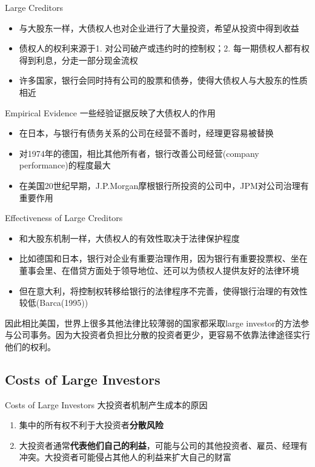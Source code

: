 %
	\begin{frame}{Large Creditors}
	\begin{itemize}
	\item 与大股东一样，大债权人也对企业进行了大量投资，希望从投资中得到收益
	\item 债权人的权利来源于1. 对公司破产或违约时的控制权；2. 每一期债权人都有权得到利息，分走一部分现金流权
	\item 许多国家，银行会同时持有公司的股票和债券，使得大债权人与大股东的性质相近
	\end{itemize}

\end{frame}

	\begin{frame}{Empirical Evidence}
	一些经验证据反映了大债权人的作用
	\begin{itemize}
	\item 在日本，与银行有债务关系的公司在经营不善时，经理更容易被替换
	\item 对1974年的德国，相比其他所有者，银行改善公司经营(company performance)的程度最大
	\item 在美国20世纪早期，J.P.Morgan摩根银行所投资的公司中，JPM对公司治理有重要作用
	\end{itemize}
\end{frame}

	\begin{frame}{Effectiveness of Large Creditors}
	
	\begin{itemize}
	\item 和大股东机制一样，大债权人的有效性取决于法律保护程度
	\item 比如德国和日本，银行对企业有重要治理作用，因为银行有重要投票权、坐在董事会里、在借贷方面处于领导地位、还可以为债权人提供友好的法律环境
	\item 但在意大利，将控制权转移给银行的法律程序不完善，使得银行治理的有效性较低(Barca(1995))
	\end{itemize}
	\vspace{1em}
	 因此相比美国，世界上很多其他法律比较薄弱的国家都采取large investor的方法参与公司事务。因为大投资者负担比分散的投资者更少，更容易不依靠法律途径实行他们的权利。

\end{frame}

\subsection{Costs of Large Investors}
%
\begin{frame}{Costs of Large Investors}
	大投资者机制产生成本的原因
	\begin{enumerate}
	\item 集中的所有权不利于大投资者\textbf{分散风险}
	\item 大投资者通常\textbf{代表他们自己的利益}，可能与公司的其他投资者、雇员、经理有冲突。大投资者可能侵占其他人的利益来扩大自己的财富
	\end{enumerate}
\end{frame}


